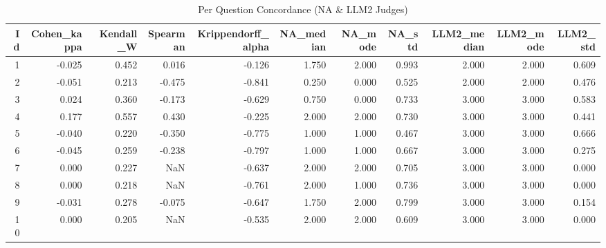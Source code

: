 \begin{table}
\caption{Per Question Concordance (NA & LLM2 Judges)}
\label{tab:per_question_concordance_NA_LLM2_judges}
\begin{tabular}{rrrrrrrrrrr}
\toprule
Id & Cohen_kappa & Kendall_W & Spearman & Krippendorff_alpha & NA_median & NA_mode & NA_std & LLM2_median & LLM2_mode & LLM2_std \\
\midrule
1 & -0.025 & 0.452 & 0.016 & -0.126 & 1.750 & 2.000 & 0.993 & 2.000 & 2.000 & 0.609 \\
2 & -0.051 & 0.213 & -0.475 & -0.841 & 0.250 & 0.000 & 0.525 & 2.000 & 2.000 & 0.476 \\
3 & 0.024 & 0.360 & -0.173 & -0.629 & 0.750 & 0.000 & 0.733 & 3.000 & 3.000 & 0.583 \\
4 & 0.177 & 0.557 & 0.430 & -0.225 & 2.000 & 2.000 & 0.730 & 3.000 & 3.000 & 0.441 \\
5 & -0.040 & 0.220 & -0.350 & -0.775 & 1.000 & 1.000 & 0.467 & 3.000 & 3.000 & 0.666 \\
6 & -0.045 & 0.259 & -0.238 & -0.797 & 1.000 & 1.000 & 0.667 & 3.000 & 3.000 & 0.275 \\
7 & 0.000 & 0.227 & NaN & -0.637 & 2.000 & 2.000 & 0.705 & 3.000 & 3.000 & 0.000 \\
8 & 0.000 & 0.218 & NaN & -0.761 & 2.000 & 1.000 & 0.736 & 3.000 & 3.000 & 0.000 \\
9 & -0.031 & 0.278 & -0.075 & -0.647 & 1.750 & 2.000 & 0.799 & 3.000 & 3.000 & 0.154 \\
10 & 0.000 & 0.205 & NaN & -0.535 & 2.000 & 2.000 & 0.609 & 3.000 & 3.000 & 0.000 \\
\bottomrule
\end{tabular}
\end{table}
